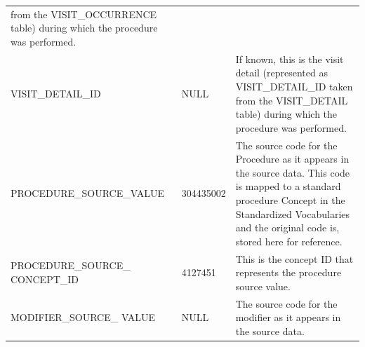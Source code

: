 \documentclass[11pt]{book}
\begin{document}
\begin{longtable}[]{@{}lll@{}}
\begin{minipage}[t]{0.46\columnwidth}
from the VISIT\_OCCURRENCE table) during which the procedure was
performed.\strut
\end{minipage}\tabularnewline
\begin{minipage}[t]{0.36\columnwidth}\raggedright\strut
VISIT\_DETAIL\_ID\strut
\end{minipage} & \begin{minipage}[t]{0.09\columnwidth}\raggedright\strut
NULL\strut
\end{minipage} & \begin{minipage}[t]{0.46\columnwidth}\raggedright\strut
If known, this is the visit detail (represented as VISIT\_DETAIL\_ID
taken from the VISIT\_DETAIL table) during which the procedure was
performed.\strut
\end{minipage}\tabularnewline
\begin{minipage}[t]{0.36\columnwidth}\raggedright\strut
PROCEDURE\_SOURCE\_VALUE\strut
\end{minipage} & \begin{minipage}[t]{0.09\columnwidth}\raggedright\strut
304435002\strut
\end{minipage} & \begin{minipage}[t]{0.46\columnwidth}\raggedright\strut
The source code for the Procedure as it appears in the source data. This
code is mapped to a standard procedure Concept in the Standardized
Vocabularies and the original code is, stored here for reference.\strut
\end{minipage}\tabularnewline
\begin{minipage}[t]{0.36\columnwidth}\raggedright\strut
PROCEDURE\_SOURCE\_ CONCEPT\_ID\strut
\end{minipage} & \begin{minipage}[t]{0.09\columnwidth}\raggedright\strut
4127451\strut
\end{minipage} & \begin{minipage}[t]{0.46\columnwidth}\raggedright\strut
This is the concept ID that represents the procedure source value.\strut
\end{minipage}\tabularnewline
\begin{minipage}[t]{0.36\columnwidth}\raggedright\strut
MODIFIER\_SOURCE\_ VALUE\strut
\end{minipage} & \begin{minipage}[t]{0.09\columnwidth}\raggedright\strut
NULL\strut
\end{minipage} & \begin{minipage}[t]{0.46\columnwidth}\raggedright\strut
The source code for the modifier as it appears in the source data.\strut
\end{minipage}\tabularnewline
\bottomrule
\end{longtable}
\end{document}
